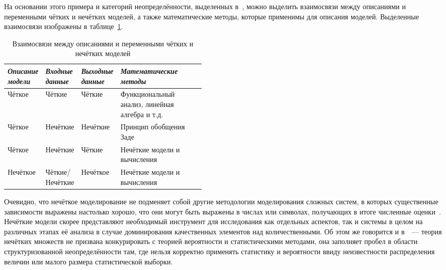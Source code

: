На основании этого примера и категорий неопределённости, выделенных в~\cite{Yarushkina}, можно выделить взаимосвязи между описаниями и переменными чётких и нечётких моделей, а также математические методы, которые применимы для описания моделей. Выделенные взаимосвязи изображены в таблице~\ref{t:fuzzy-modeling-approaches}.
\begin{table}[h!]
\caption{Взаимосвязи между описаниями и переменными чётких и нечётких моделей}
\label{t:fuzzy-modeling-approaches}
\begin{center}
\begin{tabularx}{\textwidth}{|p{0.15\linewidth}|p{0.15\linewidth}|p{0.15\linewidth}|X|}
	\hline
		\centering \textit{Описание модели} & \centering \textit{Входные данные} & \centering \textit{Выходные данные} & \centering \textit{Математические методы} \tabularnewline	\hline
	\hline
		Чёткое & Чёткие & Чёткие & Функциональный анализ, линейная алгебра и т.д. \tabularnewline
	\hline
		Чёткое & Нечёткие & Нечёткие & Принцип обобщения Заде \tabularnewline
	\hline
		Чёткое & Нечёткие & Чёткие & Нечёткие модели и вычисления \tabularnewline
	\hline
		Нечёткое & Чёткие/\allowbreak Нечёткие & Нечёткое & Нечёткие модели и вычисления \tabularnewline
  \hline
\end{tabularx}
\end{center}
\end{table}

Очевидно, что нечёткое моделирование не подменяет собой другие методологии моделирования сложных систем, в которых существенные зависимости выражены настолько хорошо, что они могут быть выражены в числах или символах, получающих в итоге численные оценки~\cite{Borisov_Fedulov}. Нечёткие модели скорее представляют необходимый инструмент для исследования как отдельных аспектов, так и системы в целом на различных этапах её анализа в случае доминирования качественных элементов над количественными. Об этом же говорится и в~\cite{Kaufmann, Borisov_Alexeev_Msk}~--- теория нечётких множеств не призвана конкурировать с теорией вероятности и статистическими методами, она заполняет пробел в области структуризованной неопределённости там, где нельзя корректно применять статистику и вероятности ввиду неизвестности распределения величин или малого размера статистической выборки.


